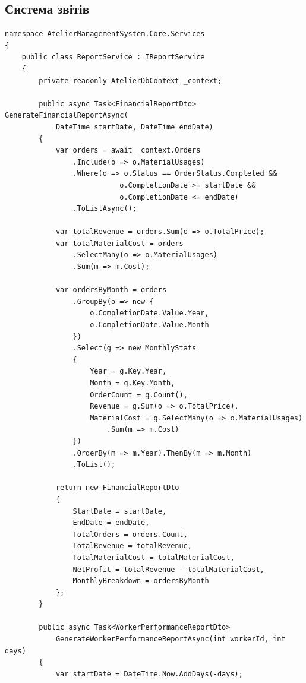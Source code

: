 \documentclass[14pt,a4paper]{extarticle}
\begin{document}
\subsection{Система звітів}

\begin{lstlisting}[language={[Sharp]C}, caption=Сервіс формування звітів, basicstyle=\small\ttfamily, breaklines=true, frame=single]
namespace AtelierManagementSystem.Core.Services
{
    public class ReportService : IReportService
    {
        private readonly AtelierDbContext _context;
        
        public async Task<FinancialReportDto> GenerateFinancialReportAsync(
            DateTime startDate, DateTime endDate)
        {
            var orders = await _context.Orders
                .Include(o => o.MaterialUsages)
                .Where(o => o.Status == OrderStatus.Completed &&
                           o.CompletionDate >= startDate &&
                           o.CompletionDate <= endDate)
                .ToListAsync();
            
            var totalRevenue = orders.Sum(o => o.TotalPrice);
            var totalMaterialCost = orders
                .SelectMany(o => o.MaterialUsages)
                .Sum(m => m.Cost);
            
            var ordersByMonth = orders
                .GroupBy(o => new { 
                    o.CompletionDate.Value.Year, 
                    o.CompletionDate.Value.Month 
                })
                .Select(g => new MonthlyStats
                {
                    Year = g.Key.Year,
                    Month = g.Key.Month,
                    OrderCount = g.Count(),
                    Revenue = g.Sum(o => o.TotalPrice),
                    MaterialCost = g.SelectMany(o => o.MaterialUsages)
                        .Sum(m => m.Cost)
                })
                .OrderBy(m => m.Year).ThenBy(m => m.Month)
                .ToList();
            
            return new FinancialReportDto
            {
                StartDate = startDate,
                EndDate = endDate,
                TotalOrders = orders.Count,
                TotalRevenue = totalRevenue,
                TotalMaterialCost = totalMaterialCost,
                NetProfit = totalRevenue - totalMaterialCost,
                MonthlyBreakdown = ordersByMonth
            };
        }
        
        public async Task<WorkerPerformanceReportDto> 
            GenerateWorkerPerformanceReportAsync(int workerId, int days)
        {
            var startDate = DateTime.Now.AddDays(-days);
            

\end{lstlisting}
\end{document}
